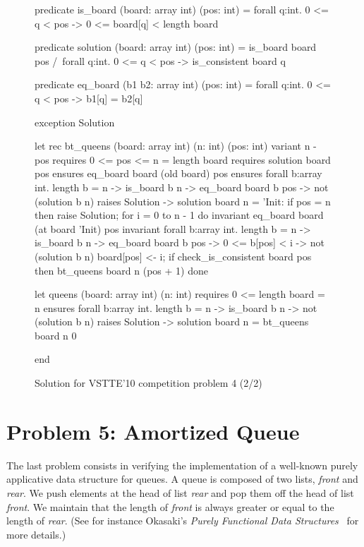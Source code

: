 \begin{figure}
  \centering
\begin{whycode}
  predicate is_board (board: array int) (pos: int) =
    forall q:int. 0 <= q < pos -> 0 <= board[q] < length board

  predicate solution (board: array int) (pos: int) =
    is_board board pos /\
    forall q:int. 0 <= q < pos -> is_consistent board q

  predicate eq_board (b1 b2: array int) (pos: int) =
    forall q:int. 0 <= q < pos -> b1[q] = b2[q]

  exception Solution

  let rec bt_queens (board: array int) (n: int) (pos: int)
    variant  { n - pos }
    requires { 0 <= pos <= n = length board }
    requires { solution board pos }
    ensures  { eq_board board (old board) pos }
    ensures  { forall b:array int. length b = n -> is_board b n ->
                 eq_board board b pos -> not (solution b n) }
    raises   { Solution -> solution board n }
  = 'Init:
    if pos = n then raise Solution;
    for i = 0 to n - 1 do
      invariant { eq_board board (at board 'Init) pos }
      invariant { forall b:array int. length b = n -> is_board b n ->
        eq_board board b pos -> 0 <= b[pos] < i -> not (solution b n) }
      board[pos] <- i;
      if check_is_consistent board pos then bt_queens board n (pos + 1)
    done

  let queens (board: array int) (n: int)
    requires { 0 <= length board = n }
    ensures  { forall b:array int.
                 length b = n -> is_board b n -> not (solution b n) }
    raises   { Solution -> solution board n }
  = bt_queens board n 0

end
\end{whycode}
\vspace*{-1em}%
  \caption{Solution for VSTTE'10 competition problem 4 (2/2)}
  \label{fig:NQueens2}
\end{figure}

\section{Problem 5: Amortized Queue}

The last problem consists in verifying the implementation of a
well-known purely applicative data structure for queues.
A queue is composed of two lists, \textit{front} and \textit{rear}.
We push elements at the head of list \textit{rear} and pop them off
the head of list \textit{front}. We maintain that the length of
\textit{front} is always greater or equal to the length of \textit{rear}.
(See for instance Okasaki's \emph{Purely Functional Data
  Structures}~\cite{okasaki98} for more details.)

